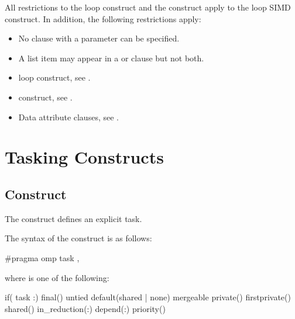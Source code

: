 \restrictions
All restrictions to the loop construct and the  construct apply to the loop SIMD 
construct. In addition, the following restrictions apply:

\begin{itemize}
\item No  clause with a parameter can be specified.
\item A list item may appear in a  or  clause but not both.
\end{itemize}

\begin{samepage}
\crossreferences
\begin{itemize}
\item loop construct, see 
.

\item {} construct, see 
.

\item Data attribute clauses, see 
. 
\end{itemize}
\end{samepage}



\pagebreak
\section{Tasking Constructs}
\label{sec:Tasking Constructs}
\subsection{ Construct}
\label{subsec:task Construct}
\summary
The  construct defines an explicit task.

\begin{samepage}
\syntax
\ccppspecificstart
The syntax of the  construct is as follows: 

\begin{boxedcode}
\#pragma omp task \plc{[clause[ [},\plc{] clause] ... ] new-line}
\end{boxedcode}
\end{samepage}

\begin{samepage}
where  is one of the following: 

\begin{indentedcodelist}
if(\plc{[} task :\plc{] scalar-expression})
final()
untied
default(shared \textnormal{|} none)
mergeable
private()
firstprivate()
shared()
in_reduction(:)
depend(:)
priority()
\end{indentedcodelist}
\ccppspecificend
\end{samepage}

